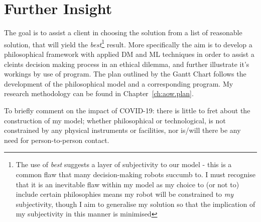 \section{Further Insight}\label{ch:intro.plan}
The goal is to assist a client in choosing the solution from a list of reasonable solution, that will yield the \textit{best}\footnote{The use of \textit{best} suggests a layer of subjectivity to our model - this is a common flaw that many decision-making robots succumb to. I must recognise that it is an inevitable flaw within my model as my choice to (or not to) include certain philosophies means my robot will be constrained to \textit{my} subjectivity, though I aim to generalise my solution so that the implication of my subjectivity in this manner is minimised} result. More specifically the aim is to develop a philosophical framework with applied DM and ML techniques in order to assist a cleints decision making process in an ethical dilemma, and further illustrate it's workings by use of program. The plan outlined by the Gantt Chart follows the development of the philosophical model and a corresponding program. My research methodology can be found in Chapter~\ref{ch:aow.plan}.

To briefly comment on the impact of COVID-19: there is little to fret about the construction of my model; whether philosophical or technological, is not constrained by any physical instruments or facilities, nor is/will there be any need for person-to-person contact.